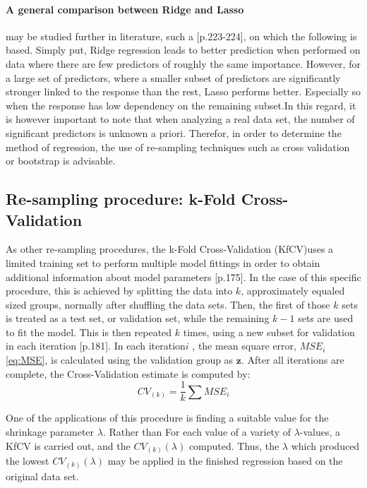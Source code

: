 \documentclass[%
oneside,                 %
final,                   %
10pt]{article}
\begin{document}
\paragraph{A general comparison between Ridge and Lasso} may be studied further in literature, such a \citep{2017introstatlearn}[p.223-224], on which the following is based. Simply put, Ridge regression leads to better prediction when performed on data where there are few predictors of roughly the same importance. However, for a large set of predictors, where a smaller subset of predictors are significantly stronger linked to the response than the rest, Lasso performs better. Especially so when the response has low dependency on the remaining subset.In this regard, it is however important to note that when analyzing a real data set, the number of significant predictors is unknown a priori. Therefor, in order to determine the method of regression, the use of re-sampling techniques such as cross validation or bootstrap is advisable.

 
\subsection{Re-sampling procedure: k-Fold Cross-Validation} \label{M:kfold}
As other re-sampling procedures, the k-Fold Cross-Validation (KfCV)uses a limited training set to perform multiple model fittings in order to obtain additional information about model parameters \citep{2017introstatlearn}[p.175]. In the case of this specific procedure, this is achieved by splitting the data into $k$, approximately equaled sized groups, normally after shuffling the data sets. Then, the first of those $k$ sets is treated as a test set, or validation set, while the remaining $k-1$ sets are used to fit the model. This is then repeated $k$ times, using a new subset for validation in each iteration \citep{2017introstatlearn}[p.181]. In each iteration$ i$ , the mean square error, $MSE_i$ \eqref{eq:MSE}, is calculated using the validation group as $\bm{z}$. After all iterations are complete, the Cross-Validation estimate is computed by:
\begin{equation}
CV_(k)=\frac{1}{k}\sum MSE_i
\end{equation}

One of the applications of this procedure is finding a suitable value for the shrinkage parameter $\lambda$. Rather than For each value of a variety of $\lambda$-values, a KfCV is carried out, and the $CV_(k)(\lambda)$ computed. Thus, the $\lambda$ which produced the lowest $CV_(k)(\lambda)$ may be applied in the finished regression based on the original data set.
\end{document}

